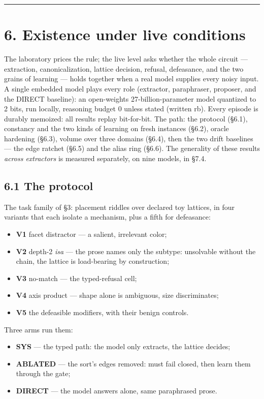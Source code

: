 \documentclass[11pt]{article}
\begin{document}
\medskip\hrule\medskip

\section*{6. Existence under live conditions}

The laboratory prices the rule; the live level asks whether the whole circuit — extraction, canonicalization, lattice decision, refusal, defeasance, and the two grains of learning — holds together when a real model supplies every noisy input. A single embedded model plays every role (extractor, paraphraser, proposer, and the DIRECT baseline): an open-weights 27-billion-parameter model quantized to 2 bits, run locally, reasoning budget 0 unless stated (written rb). Every episode is durably memoized: all results replay bit-for-bit. The path: the protocol (§6.1), constancy and the two kinds of learning on fresh instances (§6.2), oracle hardening (§6.3), volume over three domains (§6.4), then the two drift baselines — the edge ratchet (§6.5) and the alias ring (§6.6). The generality of these results \emph{across extractors} is measured separately, on nine models, in §7.4.

\subsection*{6.1 The protocol}

The task family of §3: placement riddles over declared toy lattices, in four variants that each isolate a mechanism, plus a fifth for defeasance:

\begin{itemize}
\item \textbf{V1} facet distractor — a salient, irrelevant color;
\item \textbf{V2} depth-2 \emph{isa} — the prose names only the subtype: unsolvable without the chain, the lattice is load-bearing by construction;
\item \textbf{V3} no-match — the typed-refusal cell;
\item \textbf{V4} axis product — shape alone is ambiguous, size discriminates;
\item \textbf{V5} the defeasible modifiers, with their benign controls.
\end{itemize}

Three arms run them:

\begin{itemize}
\item \textbf{SYS} — the typed path: the model only extracts, the lattice decides;
\item \textbf{ABLATED} — the sort's edges removed: must fail closed, then learn them through the gate;
\item \textbf{DIRECT} — the model answers alone, same paraphrased prose.
\end{itemize}
\end{document}
